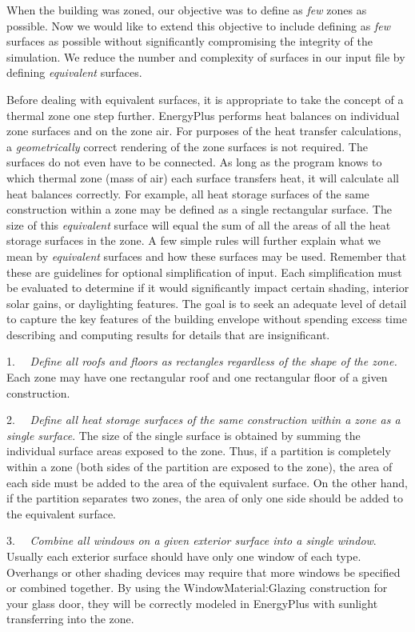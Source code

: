 When the building was zoned, our objective was to define as \emph{few} zones as possible. Now we would like to extend this objective to include defining as \emph{few} surfaces as possible without significantly compromising the integrity of the simulation. We reduce the number and complexity of surfaces in our input file by defining \emph{equivalent} surfaces.

Before dealing with equivalent surfaces, it is appropriate to take the concept of a thermal zone one step further. EnergyPlus performs heat balances on individual zone surfaces and on the zone air. For purposes of the heat transfer calculations, a \emph{geometrically} correct rendering of the zone surfaces is not required. The surfaces do not even have to be connected. As long as the program knows to which thermal zone (mass of air) each surface transfers heat, it will calculate all heat balances correctly. For example, all heat storage surfaces of the same construction within a zone may be defined as a single rectangular surface. The size of this \emph{equivalent} surface will equal the sum of all the areas of all the heat storage surfaces in the zone. A few simple rules will further explain what we mean by \emph{equivalent} surfaces and how these surfaces may be used. Remember that these are guidelines for optional simplification of input. Each simplification must be evaluated to determine if it would significantly impact certain shading, interior solar gains, or daylighting features. The goal is to seek an adequate level of detail to capture the key features of the building envelope without spending excess time describing and computing results for details that are insignificant.

1.~~ \emph{Define all roofs and floors as rectangles regardless of the shape of the zone.} Each zone may have one rectangular roof and one rectangular floor of a given construction.

2.~~ \emph{Define all heat storage surfaces of the same construction within a zone as a single surface}. The size of the single surface is obtained by summing the individual surface areas exposed to the zone. Thus, if a partition is completely within a zone (both sides of the partition are exposed to the zone), the area of each side must be added to the area of the equivalent surface. On the other hand, if the partition separates two zones, the area of only one side should be added to the equivalent surface.

3.~~ \emph{Combine all windows on a given exterior surface into a single window}. Usually each exterior surface should have only one window of each type. Overhangs or other shading devices may require that more windows be specified or combined together. By using the WindowMaterial:Glazing construction for your glass door, they will be correctly modeled in EnergyPlus with sunlight transferring into the zone.

